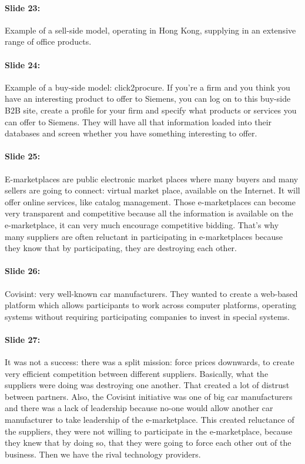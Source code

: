 \documentclass[10pt,a4paper]{report}
\begin{document}
\paragraph{Slide 23:}Example of a sell-side model, operating in Hong Kong, supplying in an extensive range of office products.

\paragraph{Slide 24:}Example of a buy-side model: click2procure. If you're a firm and you think you have an interesting product to offer to Siemens, you can log on to this buy-side B2B site, create a profile for your firm and specify what products or services you can offer to Siemens. They will have all that information loaded into their databases and screen whether you have something interesting to offer.

\paragraph{Slide 25:}E-marketplaces are public electronic market places where many buyers and many sellers are going to connect: virtual market place, available on the Internet. It will offer online services, like catalog management. 
Those e-marketplaces can become very transparent and competitive because all the information is available on the e-marketplace, it can very much encourage competitive bidding. That's why many suppliers are often reluctant in participating in e-marketplaces because they know that by participating, they are destroying each other.

\paragraph{Slide 26:}Covisint: very well-known car manufacturers. They wanted to create a web-based platform which allows participants to work across computer platforms, operating systems without requiring participating companies to invest in special systems.

\paragraph{Slide 27:}It was not a success: there was a split mission: force prices downwards, to create very efficient competition between different suppliers. Basically, what the suppliers were doing was destroying one another. That created a lot of distrust between partners. Also, the Covisint initiative was one of big car manufacturers and there was a lack of leadership because no-one would allow another car manufacturer to take leadership of the e-marketplace. This created reluctance of the suppliers, they were not willing to participate in the e-marketplace, because they knew that by doing so, that they were going to force each other out of the business. Then we have the rival technology providers.
\end{document}
